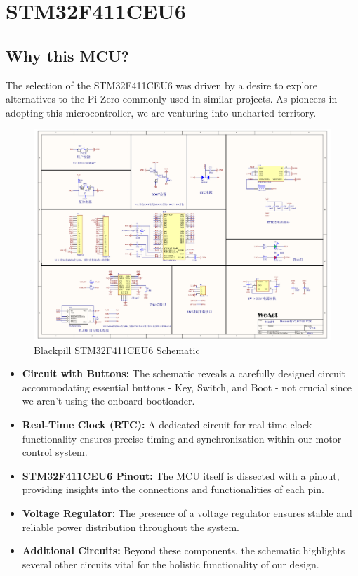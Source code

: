 \section{STM32F411CEU6} \label{section:STM32F411CEU6}
\subsection{Why this MCU?} \label{subsection:Why_this_MCU}
The selection of the STM32F411CEU6 was driven by a desire to explore alternatives to the Pi Zero commonly used in similar projects. As pioneers in adopting this microcontroller, we are venturing into uncharted territory.
\begin{figure}[H]
    \centering
    \includegraphics[width=1\linewidth]{img//blackpill/original-schematic-STM32F411CEU6_WeAct_Black_Pill_V2.0.pdf}
    \caption{Blackpill STM32F411CEU6 Schematic}
    \label{fig:Blackpill_STM32F411CEU6_Schematic}
\end{figure}
\begin{itemize}
    \item \textbf{Circuit with Buttons:} The schematic reveals a carefully designed circuit accommodating essential buttons - Key, Switch, and Boot - not crucial since we aren't using the onboard bootloader.

    \item \textbf{Real-Time Clock (RTC):} A dedicated circuit for real-time clock functionality ensures precise timing and synchronization within our motor control system.

    \item \textbf{STM32F411CEU6 Pinout:} The MCU itself is dissected with a pinout, providing insights into the connections and functionalities of each pin.

    \item \textbf{Voltage Regulator:} The presence of a voltage regulator ensures stable and reliable power distribution throughout the system.

    \item \textbf{Additional Circuits:} Beyond these components, the schematic highlights several other circuits vital for the holistic functionality of our design.
\end{itemize}

